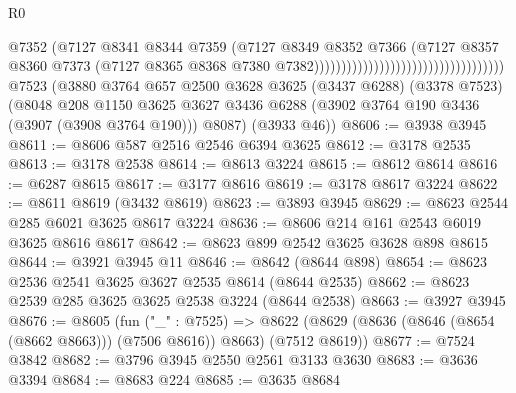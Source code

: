 \begin{lexlean}{R0}
\begin{coremodule}
                                                                  @7352
                                                                  (@7127
                                                                    @8341
                                                                    @8344
                                                                    @7359
                                                                    (@7127
                                                                      @8349
                                                                      @8352
                                                                      @7366
                                                                      (@7127
                                                                        @8357
                                                                        @8360
                                                                        @7373
                                                                        (@7127
                                                                          @8365
                                                                          @8368
                                                                          @7380
                                                                          @7382)))))))))))))))))))))))))))))))))))
    @7523
    (@3880
      @3764
      @657
      @2500
      @3628
      @3625
      (@3437 @6288)
      (@3378 @7523)
      (@8048
        @208
        @1150
        @3625
        @3627
        @3436
        @6288
        (@3902 @3764 @190 @3436 (@3907 (@3908 @3764 @190)))
        @8087)
      (@3933 @46))
@8606 := @3938 @3945
@8611 := @8606 @587 @2516 @2546 @6394 @3625
@8612 := @3178 @2535
@8613 := @3178 @2538
@8614 := @8613 @3224
@8615 := @8612 @8614
@8616 := @6287 @8615
@8617 := @3177 @8616
@8619 := @3178 @8617 @3224
@8622 := @8611 @8619 (@3432 @8619)
@8623 := @3893 @3945
@8629 := @8623 @2544 @285 @6021 @3625 @8617 @3224
@8636 := @8606 @214 @161 @2543 @6019 @3625 @8616 @8617
@8642 := @8623 @899 @2542 @3625 @3628 @898 @8615
@8644 := @3921 @3945 @11
@8646 := @8642 (@8644 @898)
@8654 := @8623 @2536 @2541 @3625 @3627 @2535 @8614 (@8644 @2535)
@8662 := @8623 @2539 @285 @3625 @3625 @2538 @3224 (@8644 @2538)
@8663 := @3927 @3945
@8676 := @8605
    (fun ("_" : @7525) =>
    @8622 (@8629 (@8636 (@8646 (@8654 (@8662 @8663))) (@7506 @8616)) @8663) (@7512 @8619))
@8677 := @7524 @3842
@8682 := @3796 @3945 @2550 @2561 @3133 @3630
@8683 := @3636 @3394
@8684 := @8683 @224
@8685 := @3635 @8684

\end{coremodule}
\end{lexlean}
